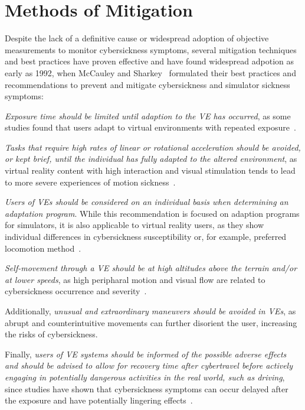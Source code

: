 \section{Methods of Mitigation}\label{sec:methods-of-mitigation}

Despite the lack of a definitive cause or widespread adoption of objective measurements to monitor cybersickness
symptoms, several mitigation techniques and best practices have proven effective and have found widespread adpotion
as early as 1992, when McCauley and Sharkey~\cite{McCauley1992} formulated their best practices and recommendations
to prevent and mitigate cybersickness and simulator sickness symptoms:

\textit{Exposure time should be limited until adaption to the VE has occurred}, as some studies found that users
adapt to virtual environments with repeated exposure~\cite{Hill2000}.

\textit{Tasks that require high rates of linear or rotational acceleration should be avoided, or kept brief, until the
individual has fully adapted to the altered environment}, as virtual reality content with high interaction and visual
stimulation tends to lead to more severe experiences of motion sickness~\cite{Saredakis2020}.

\textit{Users of VEs should be considered on an individual basis when determining an adaptation program}.
While this recommendation is focused on adaption programs for simulators, it is also applicable to virtual reality
users, as they show individual differences in cybersickness susceptibility or, for example, preferred locomotion 
method~\cite{Clifton2020}.

\textit{Self-movement through a VE should be at high altitudes above the terrain and/or at lower speeds}, as high
peripharal motion and visual flow are related to cybersickness occurrence and severity~\cite{Buhler2018}.

Additionally, \textit{unusual and extraordinary maneuvers should be avoided in VEs}, as abrupt and counterintuitive
movements can further disorient the user, increasing the risks of cybersickness.

Finally, \textit{users of VE systems should be informed of the possible adverse effects and should be advised to
allow for recovery time after cybertravel before actively engaging in potentially dangerous activities in the real
world, such as driving}, since studies have shown that cybersickness symptoms can occur delayed after the exposure
and have potentially lingering effects~\cite{LaViola2000}.

